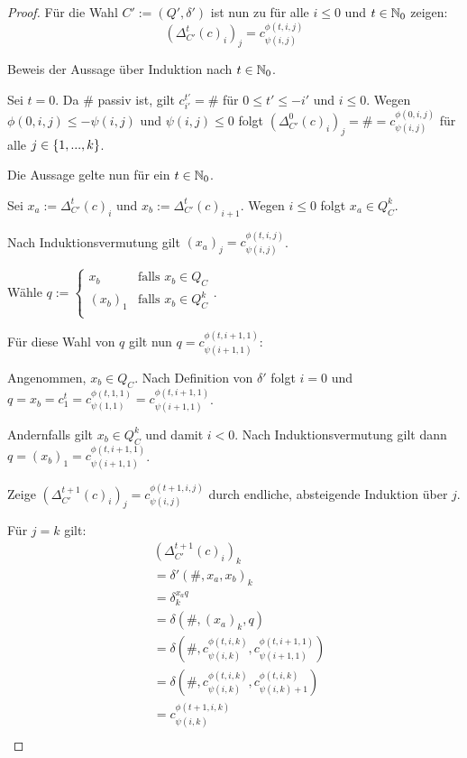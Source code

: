 \begin{proof}
    Für die Wahl $C' := (Q', \delta')$ ist nun zu für alle $i \leq 0$ und $t \in \mathbb{N}_0$ zeigen: \[
        (\Delta^{t}_{C'}(c)_i)_j = c^{\phi(t, i, j)}_{\psi(i, j)}
    \]
    
    Beweis der Aussage über Induktion nach $t \in \mathbb{N}_0$.
    
    Sei $t = 0$. Da $\#$ passiv ist, gilt $c^{t'}_{i'} = \#$ für $0 \leq t' \leq -i'$ und $i \leq 0$.
    Wegen $\phi(0, i, j) \leq -\psi(i, j)$ und $\psi(i, j) \leq 0$ folgt
    $(\Delta^{0}_{C'}(c)_i)_j = \# = c^{\phi(0, i, j)}_{\psi(i, j)}$ für alle $j \in \{ {1, ..., k} \}$.
    
    Die Aussage gelte nun für ein $t \in \mathbb{N}_0$.
    
    Sei $x_a := \Delta^{t}_{C'}(c)_i$ und $x_b := \Delta^{t}_{C'}(c)_{i+1}$.
    Wegen $i \leq 0$ folgt $x_a \in Q^k_C$.
    
    
    Nach Induktionsvermutung gilt $(x_a)_j = c^{\phi(t, i, j)}_{\psi(i, j)}$.
    
    Wähle $q :=
    \begin{cases}
        x_b & \text{falls } x_b \in Q_C \\
        (x_b)_1 & \text{falls } x_b \in Q^k_C \\
    \end{cases}$.
    
    Für diese Wahl von $q$ gilt nun $q = c^{\phi(t, i + 1, 1)}_{\psi(i + 1, 1)}$:
    
    Angenommen, $x_b \in Q_C$. Nach Definition von $\delta'$ folgt $i = 0$
    und $q = x_b = c^t_1 = c^{\phi(t, 1, 1)}_{\psi(1, 1)} = c^{\phi(t, i + 1, 1)}_{\psi(i + 1, 1)}$.
    
    Andernfalls gilt $x_b \in Q^k_C$ und damit $i < 0$.
    Nach Induktionsvermutung gilt dann
    $q = (x_b)_1 = c^{\phi(t, i + 1, 1)}_{\psi(i + 1, 1)}$.
    
    Zeige $(\Delta^{t+1}_{C'}(c)_i)_j =  c^{\phi(t + 1, i, j)}_{\psi(i, j)}$ durch endliche, absteigende Induktion über $j$.
    
    Für $j = k$ gilt:
    \begin{align*}
        & (\Delta^{t+1}_{C'}(c)_i)_k \\
        & = \delta'(\#, x_a, x_b)_k \\
        & = \delta^{x_a q}_k \\
        & = \delta(\#, (x_a)_k, q) \\
        & = \delta(\#, c^{\phi(t, i, k)}_{\psi(i, k)}, c^{\phi(t, i + 1, 1)}_{\psi(i + 1, 1)}) \\
        & = \delta(\#, c^{\phi(t, i, k)}_{\psi(i, k)}, c^{\phi(t, i, k)}_{\psi(i, k) + 1}) \\
        & = c^{\phi(t + 1, i, k)}_{\psi(i, k)} \\
    \end{align*}
    

\end{proof}
